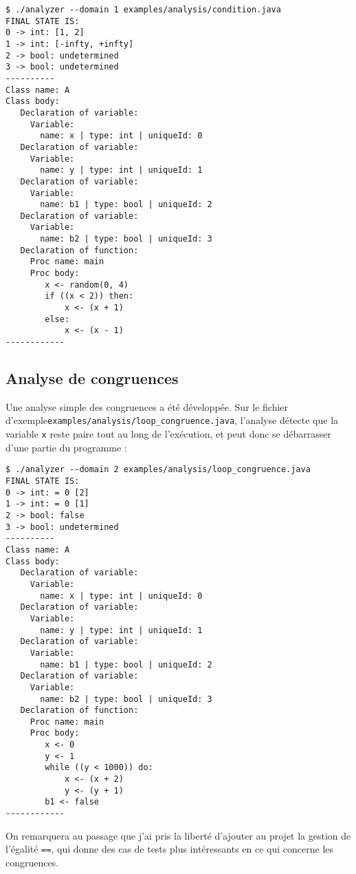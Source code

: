 \documentclass[paper=a4, fontsize=11pt]{scrartcl}
\numberwithin{figure}{section}			%
\numberwithin{table}{section}				%
\begin{document}
\begin{verbatim}
$ ./analyzer --domain 1 examples/analysis/condition.java
FINAL STATE IS:
0 -> int: [1, 2]
1 -> int: [-infty, +infty]
2 -> bool: undetermined
3 -> bool: undetermined
----------
Class name: A
Class body:
   Declaration of variable:
     Variable:
       name: x | type: int | uniqueId: 0
   Declaration of variable:
     Variable:
       name: y | type: int | uniqueId: 1
   Declaration of variable:
     Variable:
       name: b1 | type: bool | uniqueId: 2
   Declaration of variable:
     Variable:
       name: b2 | type: bool | uniqueId: 3
   Declaration of function:
     Proc name: main
     Proc body:
        x <- random(0, 4)
        if ((x < 2)) then:
            x <- (x + 1)
        else:
            x <- (x - 1)
------------
\end{verbatim}

\subsection{Analyse de congruences}

Une analyse simple des congruences a été développée. Sur le fichier d'exemple\newline \texttt{examples/analysis/loop\_congruence.java}, l'analyse détecte que la variable \texttt{x} reste paire tout au long de l'exécution, et peut donc se débarrasser d'une partie du programme :

\begin{verbatim}
$ ./analyzer --domain 2 examples/analysis/loop_congruence.java
FINAL STATE IS:
0 -> int: = 0 [2]
1 -> int: = 0 [1]
2 -> bool: false
3 -> bool: undetermined
----------
Class name: A
Class body:
   Declaration of variable:
     Variable:
       name: x | type: int | uniqueId: 0
   Declaration of variable:
     Variable:
       name: y | type: int | uniqueId: 1
   Declaration of variable:
     Variable:
       name: b1 | type: bool | uniqueId: 2
   Declaration of variable:
     Variable:
       name: b2 | type: bool | uniqueId: 3
   Declaration of function:
     Proc name: main
     Proc body:
        x <- 0
        y <- 1
        while ((y < 1000)) do:
            x <- (x + 2)
            y <- (y + 1)
        b1 <- false
------------
\end{verbatim}

On remarquera au passage que j'ai pris la liberté d'ajouter au projet la gestion de l'égalité \texttt{==}, qui donne des cas de tests plus intéressants en ce qui concerne les congruences.
\end{document}
